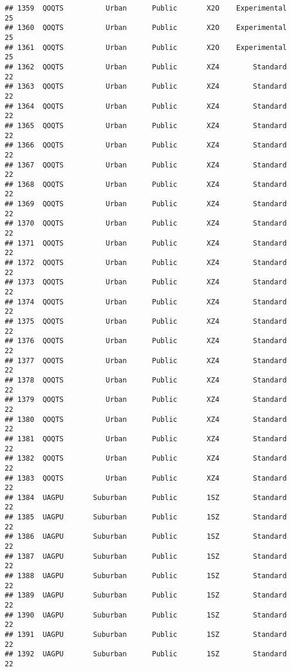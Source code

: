\documentclass[
]{article}
\begin{document}
\begin{verbatim}
## 1359  QOQTS          Urban      Public       X2O    Experimental        25
## 1360  QOQTS          Urban      Public       X2O    Experimental        25
## 1361  QOQTS          Urban      Public       X2O    Experimental        25
## 1362  QOQTS          Urban      Public       XZ4        Standard        22
## 1363  QOQTS          Urban      Public       XZ4        Standard        22
## 1364  QOQTS          Urban      Public       XZ4        Standard        22
## 1365  QOQTS          Urban      Public       XZ4        Standard        22
## 1366  QOQTS          Urban      Public       XZ4        Standard        22
## 1367  QOQTS          Urban      Public       XZ4        Standard        22
## 1368  QOQTS          Urban      Public       XZ4        Standard        22
## 1369  QOQTS          Urban      Public       XZ4        Standard        22
## 1370  QOQTS          Urban      Public       XZ4        Standard        22
## 1371  QOQTS          Urban      Public       XZ4        Standard        22
## 1372  QOQTS          Urban      Public       XZ4        Standard        22
## 1373  QOQTS          Urban      Public       XZ4        Standard        22
## 1374  QOQTS          Urban      Public       XZ4        Standard        22
## 1375  QOQTS          Urban      Public       XZ4        Standard        22
## 1376  QOQTS          Urban      Public       XZ4        Standard        22
## 1377  QOQTS          Urban      Public       XZ4        Standard        22
## 1378  QOQTS          Urban      Public       XZ4        Standard        22
## 1379  QOQTS          Urban      Public       XZ4        Standard        22
## 1380  QOQTS          Urban      Public       XZ4        Standard        22
## 1381  QOQTS          Urban      Public       XZ4        Standard        22
## 1382  QOQTS          Urban      Public       XZ4        Standard        22
## 1383  QOQTS          Urban      Public       XZ4        Standard        22
## 1384  UAGPU       Suburban      Public       1SZ        Standard        22
## 1385  UAGPU       Suburban      Public       1SZ        Standard        22
## 1386  UAGPU       Suburban      Public       1SZ        Standard        22
## 1387  UAGPU       Suburban      Public       1SZ        Standard        22
## 1388  UAGPU       Suburban      Public       1SZ        Standard        22
## 1389  UAGPU       Suburban      Public       1SZ        Standard        22
## 1390  UAGPU       Suburban      Public       1SZ        Standard        22
## 1391  UAGPU       Suburban      Public       1SZ        Standard        22
## 1392  UAGPU       Suburban      Public       1SZ        Standard        22

\end{verbatim}
\end{document}
